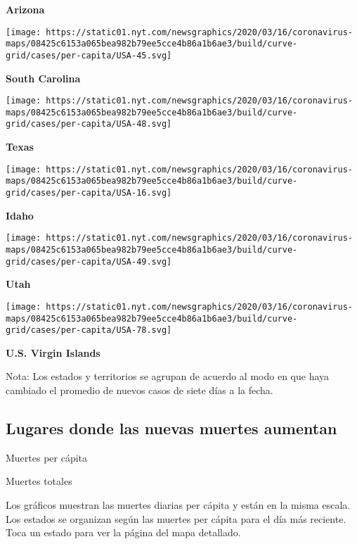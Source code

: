 \textbf{Arizona}

\href{https://www.nytimes.com/interactive/2020/us/south-carolina-coronavirus-cases.html}{}

\texttt{[image: https://static01.nyt.com/newsgraphics/2020/03/16/coronavirus-maps/08425c6153a065bea982b79ee5cce4b86a1b6ae3/build/curve-grid/cases/per-capita/USA-45.svg]}

\textbf{South Carolina}

\href{https://www.nytimes.com/interactive/2020/us/texas-coronavirus-cases.html}{}

\texttt{[image: https://static01.nyt.com/newsgraphics/2020/03/16/coronavirus-maps/08425c6153a065bea982b79ee5cce4b86a1b6ae3/build/curve-grid/cases/per-capita/USA-48.svg]}

\textbf{Texas}

\href{https://www.nytimes.com/interactive/2020/us/idaho-coronavirus-cases.html}{}

\texttt{[image: https://static01.nyt.com/newsgraphics/2020/03/16/coronavirus-maps/08425c6153a065bea982b79ee5cce4b86a1b6ae3/build/curve-grid/cases/per-capita/USA-16.svg]}

\textbf{Idaho}

\href{https://www.nytimes.com/interactive/2020/us/utah-coronavirus-cases.html}{}

\texttt{[image: https://static01.nyt.com/newsgraphics/2020/03/16/coronavirus-maps/08425c6153a065bea982b79ee5cce4b86a1b6ae3/build/curve-grid/cases/per-capita/USA-49.svg]}

\textbf{Utah}

\texttt{[image: https://static01.nyt.com/newsgraphics/2020/03/16/coronavirus-maps/08425c6153a065bea982b79ee5cce4b86a1b6ae3/build/curve-grid/cases/per-capita/USA-78.svg]}

\textbf{U.S. Virgin Islands}

Nota: Los estados y territorios se agrupan de acuerdo al modo en que
haya cambiado el promedio de nuevos casos de siete días a la fecha.

\hypertarget{lugares-donde-las-nuevas-muertes-aumentan}{%
\subsection{Lugares donde las nuevas muertes
aumentan}\label{lugares-donde-las-nuevas-muertes-aumentan}}

Muertes per cápita

Muertes totales

Los gráficos muestran las muertes diarias per cápita y están en la misma
escala. Los estados se organizan según las muertes per cápita para el
día más reciente. Toca un estado para ver la página del mapa detallado.

